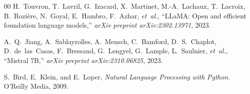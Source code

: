 \documentclass[conference]{IEEEtran}
\begin{document}
\begin{thebibliography}{00}
H.~Touvron, T.~Lavril, G.~Izacard, X.~Martinet, M.-A.~Lachaux, T.~Lacroix, B.~Rozi{\`e}re, N.~Goyal, E.~Hambro, F.~Azhar, \textit{et~al.}, ``LLaMA: Open and efficient foundation language models,'' \textit{arXiv preprint arXiv:2302.13971}, 2023.

A.~Q.~Jiang, A.~Sablayrolles, A.~Mensch, C.~Bamford, D.~S.~Chaplot, D.~de~las~Casas, F.~Bressand, G.~Lengyel, G.~Lample, L.~Saulnier, \textit{et~al.}, ``Mistral 7B,'' \textit{arXiv preprint arXiv:2310.06825}, 2023.

S.~Bird, E.~Klein, and E.~Loper, \textit{Natural Language Processing with Python}. O'Reilly Media, 2009.

\end{thebibliography}
\end{document}
